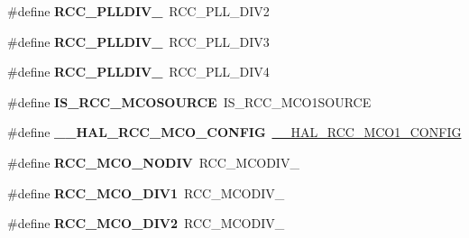 \begin{DoxyCompactItemize}
\mbox{\label{group___h_a_l___r_c_c___aliased_ga3b43997b2f4c57fb68632db0ff63ef77}} 
\#define {\bfseries R\+C\+C\+\_\+\+P\+L\+L\+D\+I\+V\+\_}~R\+C\+C\+\_\+\+P\+L\+L\+\_\+\+D\+I\+V2
\item 
\mbox{\label{group___h_a_l___r_c_c___aliased_ga64492e160608f79d4c3c751f82d09dfc}} 
\#define {\bfseries R\+C\+C\+\_\+\+P\+L\+L\+D\+I\+V\+\_}~R\+C\+C\+\_\+\+P\+L\+L\+\_\+\+D\+I\+V3
\item 
\mbox{\label{group___h_a_l___r_c_c___aliased_gaa25c3a8a7576db9c75ea868632d86120}} 
\#define {\bfseries R\+C\+C\+\_\+\+P\+L\+L\+D\+I\+V\+\_}~R\+C\+C\+\_\+\+P\+L\+L\+\_\+\+D\+I\+V4
\item 
\mbox{\label{group___h_a_l___r_c_c___aliased_ga6ae382b78e1bcec3da6d5ac79b1a5551}} 
\#define {\bfseries I\+S\+\_\+\+R\+C\+C\+\_\+\+M\+C\+O\+S\+O\+U\+R\+CE}~I\+S\+\_\+\+R\+C\+C\+\_\+\+M\+C\+O1\+S\+O\+U\+R\+CE
\item 
\mbox{\label{group___h_a_l___r_c_c___aliased_ga4a5994f41cd6798807bf8672ec3dc423}} 
\#define {\bfseries \+\_\+\+\_\+\+H\+A\+L\+\_\+\+R\+C\+C\+\_\+\+M\+C\+O\+\_\+\+C\+O\+N\+F\+IG}~\mbox{\hyperlink{group___r_c_c_ex___m_c_ox___clock___config_ga7e5f7f1efc92794b6f0e96068240b45e}{\+\_\+\+\_\+\+H\+A\+L\+\_\+\+R\+C\+C\+\_\+\+M\+C\+O1\+\_\+\+C\+O\+N\+F\+IG}}
\item 
\mbox{\label{group___h_a_l___r_c_c___aliased_ga897ae3aa8cfe31f7b00de98637db45d5}} 
\#define {\bfseries R\+C\+C\+\_\+\+M\+C\+O\+\_\+\+N\+O\+D\+IV}~R\+C\+C\+\_\+\+M\+C\+O\+D\+I\+V\+\_
\item 
\mbox{\label{group___h_a_l___r_c_c___aliased_ga411caf05a68e3bd8f14150c14d1f8404}} 
\#define {\bfseries R\+C\+C\+\_\+\+M\+C\+O\+\_\+\+D\+I\+V1}~R\+C\+C\+\_\+\+M\+C\+O\+D\+I\+V\+\_
\item 
\mbox{\label{group___h_a_l___r_c_c___aliased_ga49e93c717ea6b0916051b085aa595ecb}} 
\#define {\bfseries R\+C\+C\+\_\+\+M\+C\+O\+\_\+\+D\+I\+V2}~R\+C\+C\+\_\+\+M\+C\+O\+D\+I\+V\+\_

\end{DoxyCompactItemize}
